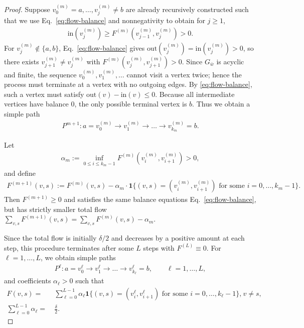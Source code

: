 \begin{proof}
Suppose $v_0^{(m)} = a, \dots, v_j^{(m)}\neq b$ are already recursively constructed such that we use Eq.~\eqref{eq:flow-balance} and nonnegativity to obtain for $j\ge1$,
\begin{align*}
    \text{in}(v_j^{(m)}) \ge F^{(m)}(v_{j-1}^{(m)},v_j^{(m)}) >0.
\end{align*}
For $v_j^{(m)}\notin\{a,b\}$, Eq.~\eqref{eq:flow-balance} gives
$\text{out}(v_j^{(m)}) = \text{in}(v_j^{(m)}) > 0$, so there exists
$v_{j+1}^{(m)}\neq v_j^{(m)}$ with $F^{(m)}(v_j^{(m)},v_{j+1}^{(m)})>0$.
Since $G_{\bar w}$ is acyclic and finite, the sequence
$v_0^{(m)},v_1^{(m)},\dots$ cannot visit a vertex twice; hence the process
must terminate at a vertex with no outgoing edges.  By
\eqref{eq:flow-balance}, such a vertex must satisfy
$\text{out}(v)-\text{in}(v)\le0$.  
Because all intermediate vertices have balance $0$, the only possible
terminal vertex is $b$.
Thus we obtain a simple path
\begin{align*}
    P^{m+1}: a = v_0^{(m)} \to v_1^{(m)} \to \dots \to v_{k_{m}}^{(m)} = b.
\end{align*}

Let
\begin{align*}
    \alpha_{m} := \inf_{0\le i\le k_{m}-1}
                    F^{(m)}(v_i^{(m)},v_{i+1}^{(m)}) >0,
\end{align*}
and define
\begin{align*}
    F^{(m+1)}(v,s)
    := F^{(m)}(v,s)
       - \alpha_{m}\cdot 
         \mathbf{1}\{(v,s)=(v_i^{(m)},v_{i+1}^{(m)}) 
                         \text{ for some }i=0,\dots,k_m-1\}.
\end{align*}
Then $F^{(m+1)}\ge0$ and satisfies the same balance equations Eq.~\eqref{eq:flow-balance}, but has strictly smaller total flow
$\sum_{v,s}F^{(m+1)}(v,s) = \sum_{v,s}F^{(m)}(v,s) - \alpha_{m}$.

Since the total flow is initially $\delta/2$ and decreases by a positive
amount at each step, this procedure terminates after some $L$ steps with
$F^{(L)}\equiv 0$.  
For $\ell=1,\dots,L$, we obtain simple paths
\begin{align*}
    P^\ell: a = v_0^\ell \to v_1^\ell \to \dots \to v_{k_\ell}^\ell=b,
    \qquad \ell=1,\dots,L,
\end{align*}
and coefficients $\alpha_\ell>0$ such that
\begin{align}
    F(v,s)
    = &~ \sum_{\ell=0}^{L-1} \alpha_\ell
       \mathbf{1}\{(v,s)=(v_i^\ell,v_{i+1}^\ell)
                       \text{ for some }i=0,\dots,k_\ell-1\},
       && v\neq s,
       \label{eq:F-decomp}\\
    \sum_{\ell=0}^{L-1} \alpha_\ell = &~ \frac{\delta}{2}.
    \label{eq:alpha-sum}
\end{align}


\end{proof}
